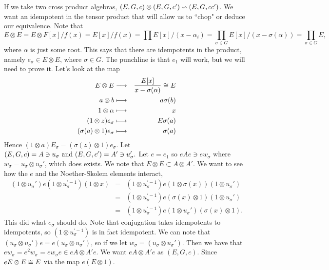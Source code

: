 If we take two cross product algebras, $(E,G,c) \otimes (E,G,c') \backsim (E,G,cc')$. We want an idempotent in the tensor product that will allow us to ``chop" or deduce our equivalence. Note that $$E\otimes E = E\otimes F[x]/f(x) = E[x]/f(x) = \prod E[x]/(x-\alpha_i) = \prod_{\sigma \in G}E[x]/(x-\sigma(\alpha)) = \prod_{\sigma \in G}E,$$
where $\alpha$ is just some root. This says that there are idempotents in the product, namely $e_{\sigma} \in E\otimes E$, where $\sigma \in G$. The punchline is that $e_1$ will work, but we will need to prove it. Let's look at the map
\begin{eqnarray*}
E\otimes E & \longrightarrow & \frac{E[x]}{x-\sigma (\alpha)} \cong E \\
a \otimes b & \longmapsto & a\sigma (b) \\
1 \otimes \alpha & \longmapsto & x \\
(1\otimes z)e_{\sigma} &\longmapsto  & E \sigma (a)\\
(\sigma (a) \otimes 1)e_{\sigma} & \longmapsto  & \sigma(a) 
\end{eqnarray*}
Hence $(1\otimes a)E_{\sigma} = (\sigma (z) \otimes 1)e_{\sigma}.$ Let $(E,G,c) = A \ni u_{\sigma}	 \text{ and } (E,G,c') = A' \ni u_{\sigma}'.$
Let $ e = e_1$ so $eAe \ni ew_{\sigma}$ where $w_{\sigma} = u_{\sigma} \otimes u_{\sigma}'$, which does exists. We note that $E \otimes E \subset A \otimes A'.$ We want to see how the $e$ and the Noether-Skolem elements interact,
\begin{eqnarray*}
(1\otimes u_{\sigma}')e(1\otimes u_{\sigma}^{'-1})(1\otimes x) &=& (1\otimes u_{\sigma}^{'-1})e(1\otimes \sigma (x))(1\otimes u_{\sigma}') \\ &=& (1\otimes u_{\sigma}^{'-1})e(\sigma(x) \otimes 1)(1\otimes u_{\sigma}') \\ &=& (1\otimes u_{\sigma}^{'-1})e(1\otimes u_{\sigma}')(\sigma (x) \otimes 1).
\end{eqnarray*}
This did what $e_{\sigma}$ should do. Note that conjugation takes idempotents to idempotents, so $(1\otimes u_{\sigma}^{'-1})$ is in fact idempotent. We can note that $(u_{\sigma}\otimes u_{\sigma}')e = e(u_{\sigma}\otimes u_{\sigma}')$, so if we let $w_{\sigma} = (u_{\sigma}\otimes u_{\sigma}').$ Then we have that $ew_{\sigma} = e^2 w_{\sigma} = ew_{\sigma}e \in eA \otimes A'e$. We want $eA \otimes A'e$ as $(E,G,c)$. Since $eE \otimes E \cong E$ via the map $e(E\otimes 1).$ 

